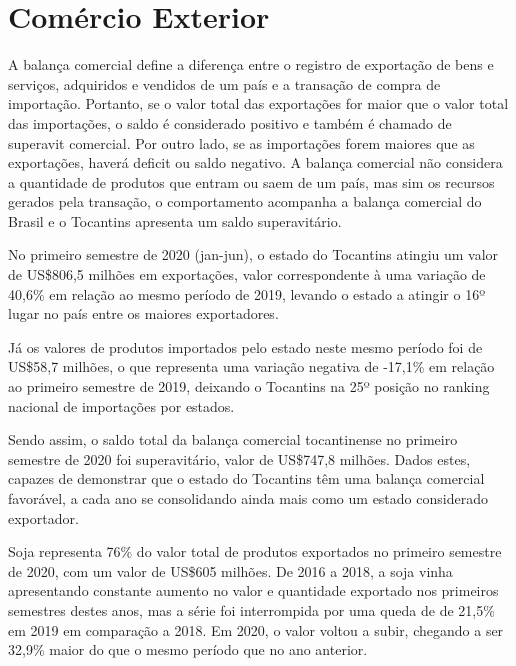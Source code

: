\chapter{Comércio Exterior}

\par A balança comercial define a diferença entre o registro de exportação de bens e serviços, adquiridos e vendidos de um país e a transação de compra de importação. Portanto, se o valor total das exportações for maior que o valor total das importações, o saldo é considerado positivo e também é chamado de superavit comercial. Por outro lado, se as importações forem maiores que as exportações, haverá deficit ou saldo negativo. A balança comercial não considera a quantidade de produtos que entram ou saem de um país, mas sim os recursos gerados pela transação, o comportamento acompanha a balança comercial do Brasil e o Tocantins apresenta um saldo superavitário.


\par No primeiro semestre de 2020 (jan-jun), o estado do Tocantins atingiu um valor de US\$806,5 milhões em exportações, valor correspondente à uma variação de 40,6\% em relação ao mesmo período de 2019, levando o estado a atingir o 16º lugar no país entre os maiores exportadores.

\par Já os valores de produtos importados pelo estado neste mesmo período foi de US\$58,7 milhões, o que representa uma variação negativa de -17,1\% em relação ao primeiro semestre de 2019, deixando o Tocantins na 25º posição no ranking nacional de importações por estados.

\par Sendo assim, o saldo total da balança comercial tocantinense no primeiro semestre de 2020 foi superavitário, valor de US\$747,8 milhões. Dados estes, capazes de demonstrar que o estado do Tocantins têm uma balança comercial favorável, a cada ano se consolidando ainda mais como um estado considerado exportador.


\par Soja representa 76\% do valor total de produtos exportados no primeiro semestre de 2020, com um valor de US\$605 milhões. De 2016 a 2018, a soja vinha apresentando constante aumento no valor e quantidade exportado nos primeiros semestres destes anos, mas a série foi interrompida por uma queda de de 21,5\% em 2019 em comparação a 2018. Em 2020, o valor voltou a subir, chegando a ser 32,9\% maior do que o mesmo período que no ano anterior.

